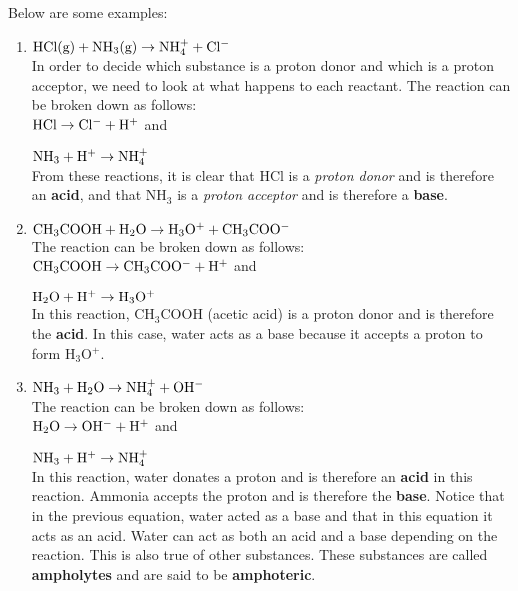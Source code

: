 Below are some examples:

\begin{enumerate}
\item{$\rm{HCl(g) + NH_{3}(g) \rightarrow NH_{4}^{+} + Cl^{-}}$\\

In order to decide which substance is a proton donor and which is a proton acceptor, we need to look at what happens to each reactant. The reaction can be broken down as follows:\\

$\rm{HCl \rightarrow Cl^{-} + H^{+}}$ and

$\rm{NH_{3} + H^{+} \rightarrow NH_{4}^{+}}$\\

From these reactions, it is clear that HCl is a \textit{proton donor} and is therefore an \textbf{acid}, and that NH$_{3}$ is a \textit{proton acceptor} and is therefore a \textbf{base}. 
}

\item{$\rm{CH_{3}COOH + H_{2}O \rightarrow H_{3}O^{+} + CH_{3}COO^{-}}$\\

The reaction can be broken down as follows:\\

$\rm{CH_{3}COOH \rightarrow CH_{3}COO^{-} + H^{+}}$ and

$\rm{H_{2}O + H^{+} \rightarrow H_{3}O^{+}}$\\

In this reaction, CH$_{3}$COOH (acetic acid) is a proton donor and is therefore the \textbf{acid}. In this case, water acts as a base because it accepts a proton to form H$_{3}$O$^{+}$.
}

\item{$\rm{NH_{3} + H_{2}O \rightarrow NH_{4}^{+} + OH^{-}}$\\

The reaction can be broken down as follows:\\

$\rm{H_{2}O \rightarrow OH^{-} + H^{+}}$ and

$\rm{NH_{3} + H^{+} \rightarrow NH_{4}^{+}}$\\

In this reaction, water donates a proton and is therefore an \textbf{acid} in this reaction. Ammonia accepts the proton  and is therefore the \textbf{base}. Notice that in the previous equation, water acted as a base and that in this equation it acts as an acid. Water can act as both an acid and a base depending on the reaction. This is also true of other substances. These substances are called \textbf{ampholytes} and are said to be \textbf{amphoteric}.}
\end{enumerate}

